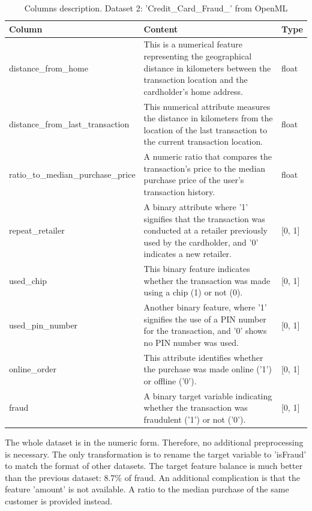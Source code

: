\documentclass[12pt,a4paper, hidelinks]{article}
\begin{document}
\begin{table}[ht!]
    \centering
    \begin{tabular}{|p{5.5cm}|p{7cm}|p{2cm}|}
    \hline
    \textbf{Column} & \textbf{Content} & \textbf{Type} \\
    \hline
    distance\_from\_home & This is a numerical feature representing the geographical distance in kilometers between the transaction location and the cardholder's home address. & float \\
    \hline
    distance\_from\_last\_transaction & This numerical attribute measures the distance in kilometers from the location of the last transaction to the current transaction location. & float \\
    \hline
    ratio\_to\_median\_purchase\_price & A numeric ratio that compares the transaction's price to the median purchase price of the user's transaction history. & float \\
    \hline
    repeat\_retailer & A binary attribute where '1' signifies that the transaction was conducted at a retailer previously used by the cardholder, and '0' indicates a new retailer. & [0, 1] \\
    \hline
    used\_chip & This binary feature indicates whether the transaction was made using a chip (1) or not (0). & [0, 1] \\
    \hline
    used\_pin\_number &  Another binary feature, where '1' signifies the use of a PIN number for the transaction, and '0' shows no PIN number was used. & [0, 1] \\
    \hline
    online\_order & This attribute identifies whether the purchase was made online ('1') or offline ('0'). & [0, 1] \\
    \hline
    fraud & A binary target variable indicating whether the transaction was fraudulent ('1') or not ('0'). & [0, 1] \\
    \hline
    \end{tabular}
    \caption{Columns description. Dataset 2: 'Credit\_Card\_Fraud\_' from OpenML}
\end{table}

The whole dataset is in the numeric form. Therefore, no additional preprocessing is necessary. The only transformation is to rename the target variable to 'isFraud' to match the format of other datasets.
The target feature balance is much better than the previous dataset: 8.7\% of fraud. An additional complication is that the feature 'amount' is not available. A ratio to the median purchase of the same customer is provided instead.
\end{document}
